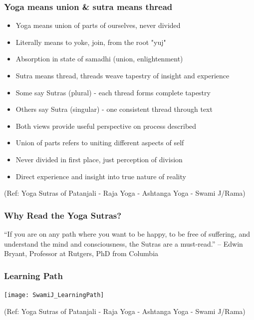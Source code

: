 \begin{frame}[fragile]\frametitle{Yoga means union \& sutra means thread}

\begin{itemize}
\item Yoga means union of parts of ourselves, never divided
\item Literally means to yoke, join, from the root "yuj"
\item Absorption in state of samadhi (union, enlightenment)
\item Sutra means thread, threads weave tapestry of insight and experience
\item Some say Sutras (plural) - each thread forms complete tapestry
\item Others say Sutra (singular) - one consistent thread through text
\item Both views provide useful perspective on process described
\item Union of parts refers to uniting different aspects of self
\item Never divided in first place, just perception of division
\item Direct experience and insight into true nature of reality
\end{itemize}

  
  \tiny{(Ref: Yoga Sutras of Patanjali - Raja Yoga - Ashtanga Yoga - Swami J/Rama)}

\end{frame}

\begin{frame}[fragile]\frametitle{Why Read the Yoga Sutras?}


\begin{center}
{\Large ``If you are on any path where you want to be happy, to be free of suffering, and understand the mind and consciousness, the Sutras are a must-read.''} – Edwin Bryant, Professor at Rutgers, PhD from Columbia
\end{center}

  

\end{frame}

\begin{frame}[fragile]\frametitle{Learning Path}

\begin{center}
\texttt{[image: SwamiJ\_LearningPath]}

\end{center}

  
  \tiny{(Ref: Yoga Sutras of Patanjali - Raja Yoga - Ashtanga Yoga - Swami J/Rama)}

\end{frame}


